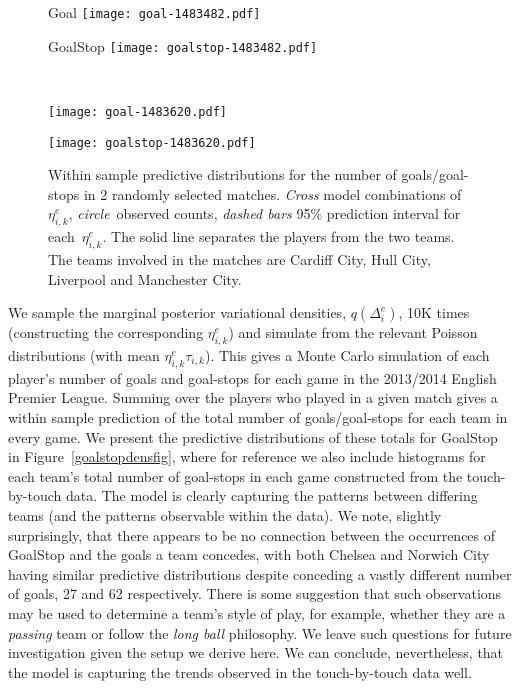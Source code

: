 \documentclass[11pt,a4paper]{article}
\begin{document}
\begin{figure}[t]
\begin{minipage}[b]{0.48\linewidth}
        \centering
        \qquad\qquad Goal\vspace{0.01cm}
        \texttt{[image: goal-1483482.pdf]}
\end{minipage} 
\begin{minipage}[b]{0.48\linewidth}
        \centering
        \qquad\qquad GoalStop\vspace{0.01cm}
        \texttt{[image: goalstop-1483482.pdf]}
\end{minipage} \\
\begin{minipage}[b]{0.48\linewidth}
        \centering
        \texttt{[image: goal-1483620.pdf]}
\end{minipage} 
\begin{minipage}[b]{0.48\linewidth}
        \centering
        \texttt{[image: goalstop-1483620.pdf]}
\end{minipage} 
      \caption{Within sample predictive distributions for the number of goals/goal-stops in 2 randomly selected matches. \emph{Cross} model combinations of $\eta_{i,k}^{e}$, \emph{circle}~observed counts, \emph{dashed bars} 95\% prediction interval for each~$\eta_{i,k}^{e}$. The solid line separates the players from the two teams. The teams involved in the matches are Cardiff City, Hull City, Liverpool and Manchester City.} \label{fitfig}
\end{figure} 


We sample the marginal posterior variational densities, $q(\Delta_i^{e})$, 
10K times (constructing the corresponding $\eta_{i,k}^{e}$) and simulate 
from the relevant Poisson distributions (with mean 
$\eta_{i,k}^{e}\tau_{i,k}$). This gives a Monte Carlo simulation of 
each player's number of goals and goal-stops for each game in the 
2013/2014 English Premier League. Summing over the players who played 
in a given match gives a within sample prediction of the 
total number of goals/goal-stops for each team in every game. We 
present the predictive distributions of these totals for GoalStop in 
Figure~\ref{goalstopdensfig}, where for reference we also include 
histograms for each team's total number of goal-stops in each 
game constructed from the touch-by-touch data. The model is clearly 
capturing the patterns between differing teams (and the patterns 
observable within the data). We note, slightly surprisingly, 
that there appears to be no connection between the occurrences of 
GoalStop and the goals a team concedes, with both Chelsea and Norwich 
City having similar predictive distributions despite conceding a 
vastly different number of goals, 27 and 62 respectively. There is 
some suggestion that such observations may be used to determine a 
team's style of play, for example, whether they are a \emph{passing} 
team or follow the \emph{long ball} philosophy. We leave such 
questions for future investigation given the setup we derive here. We 
can conclude, nevertheless, that the model is capturing the trends 
observed in the touch-by-touch data well.
\end{document}
